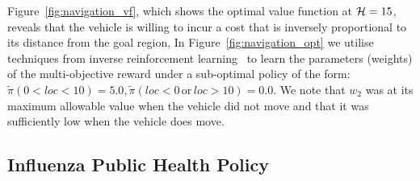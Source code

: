 Figure~\ref{fig:navigation_vf}, which shows the optimal value function at {\footnotesize$ \mathcal{H} = 15 $}, 
reveals that the vehicle is willing to incur a cost that is inversely proportional to its distance from the goal region,
In Figure~\ref{fig:navigation_opt} we utilise techniques from inverse reinforcement learning~\parencite{Ng_ICML_2000} to learn the parameters (weights) of the multi-objective reward under a sub-optimal policy of the form: {\footnotesize $ \tilde{\pi}(0 < loc < 10) = 5.0,  \tilde{\pi}(loc < 0 \,\mathrm{or}\, loc > 10) = 0.0$}. We note that {\footnotesize $ w_2 $} was at its maximum allowable value when the vehicle did not move and that it was sufficiently low when the vehicle does move. 

\subsection{Influenza Public Health Policy}
\label{sec:results_influenza}

